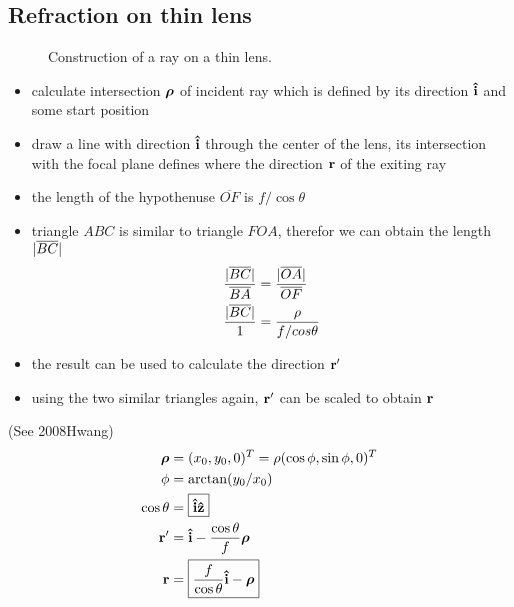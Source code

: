 \documentclass[twocolumn,DIV19]{scrartcl}
\begin{document}
\subsection{Refraction on thin lens}
\begin{figure}[!hbt]
  \centering
  
  \caption{Construction of a ray on a thin lens.}
\end{figure}
\begin{itemize}
\item calculate intersection $\boldsymbol\rho$ of incident ray which is defined
  by its direction $\mathbf{\hat{i}}$ and some start position
\item draw a line with direction $\mathbf{\hat{i}}$ through the center of the lens,
  its intersection with the focal plane defines where the direction
  $\mathbf{r}$ of the exiting ray
\item the length of the hypothenuse $\overline{OF}$ is $f/\cos\theta$
\item triangle $ABC$ is similar to triangle $FOA$, therefor we can
  obtain the length $\mathopen| \overline{BC} \mathclose|$ 
  \begin{align}
    \frac{\mathopen| \overline{BC} \mathclose|}{\overline{BA}}&=
    \frac{\mathopen| \overline{OA} \mathclose|}{\overline{OF}}\\
    \frac{\mathopen| \overline{BC} \mathclose|}{1}&=
    \frac{\rho}{f/cos\theta}
  \end{align}
\item the result can be used to calculate the direction $\mathbf{r}'$
\item using the two similar triangles again, $\mathbf{r}'$ can be scaled to
  obtain $\mathbf{r}$
\end{itemize}
(See 2008Hwang)
\begin{align}
  \boldsymbol\rho&=(x_0,y_0,0)^T=\rho (\cos\phi,\sin\phi,0)^T\\
  \phi&=\arctan(y_0/x_0)\\
  \cos\theta&=\boxed{\mathbf{\hat{i}}\mathbf{\hat{z}}}\\
  \mathbf{r}'&=\mathbf{\hat{i}}- \frac{\cos\theta}{f}\boldsymbol\rho\\
   \mathbf{r}&=\boxed{\frac{f}{\cos\theta} \mathbf{\hat{i}} -\boldsymbol\rho}
\end{align}
\end{document}
